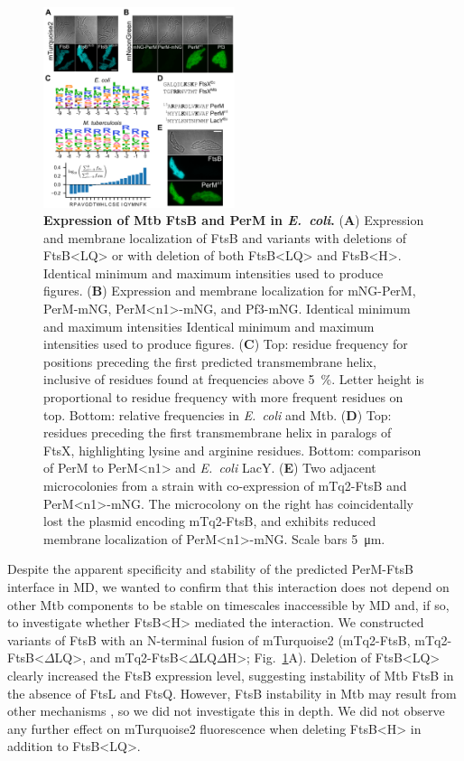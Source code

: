 \documentclass[twocolumn,pdflatex,sn-nature]{sn-jnl}%
\def\textsuperscript#1{<#1>}%
\newcommand\ec{\textit{E.~coli}}
\newcommand\mtb{Mtb}
\newcommand\ftsbLQ{FtsB\textsuperscript{LQ}}
\newcommand\ftsbH{FtsB\textsuperscript{H}}
\newcommand\ftsbdLQ{FtsB\textsuperscript{$\Delta{}$LQ}}
\newcommand\ftsbdLQdH{FtsB\textsuperscript{$\Delta{}$LQ$\Delta{}$H}}
\newcommand\permN{PerM\textsuperscript{n1}}
\begin{document}
\begin{figure}[t]
    \centering
    \includegraphics[width=0.5\textwidth]{../figures/fig2.png}
    \caption{
        \textbf{Expression of \mtb{} FtsB and PerM in \ec{}.}
        (\textbf{A}) Expression and membrane localization of FtsB and variants with deletions of \ftsbLQ{} or with deletion of both \ftsbLQ{} and \ftsbH{}. Identical minimum and maximum intensities used to produce figures.
        (\textbf{B}) Expression and membrane localization for mNG-PerM, PerM-mNG, \permN{}-mNG, and Pf3-mNG. Identical minimum and maximum intensities Identical minimum and maximum intensities used to produce figures.
        (\textbf{C}) Top: residue frequency for positions preceding the first predicted transmembrane helix, inclusive of residues found at frequencies above \qty{5}{\percent}. Letter height is proportional to residue frequency with more frequent residues on top. Bottom: relative frequencies in \ec{} and \mtb{}.
        (\textbf{D}) Top: residues preceding the first transmembrane helix in paralogs of FtsX, highlighting lysine and arginine residues. Bottom: comparison of PerM to \permN{} and \ec{} LacY.
        (\textbf{E}) Two adjacent microcolonies from a strain with co-expression of mTq2-FtsB and \permN{}-mNG. The microcolony on the right has coincidentally lost the plasmid encoding mTq2-FtsB, and exhibits reduced membrane localization of \permN{}-mNG. Scale bars \qty{5}{\um}.
    }\label{fig2}
\end{figure}

Despite the apparent specificity and stability of the predicted PerM-FtsB interface in MD, we wanted to confirm that this interaction does not depend on other \mtb{} components to be stable on timescales inaccessible by MD and, if so, to investigate whether \ftsbH{} mediated the interaction.
We constructed variants of FtsB with an N-terminal fusion of mTurquoise2 (mTq2-FtsB, mTq2-\ftsbdLQ{}, and mTq2-\ftsbdLQdH{}; Fig.~\ref{fig2}A). Deletion of \ftsbLQ{} clearly increased the FtsB expression level, suggesting instability of \mtb{} FtsB in the absence of FtsL and FtsQ.
However, FtsB instability in \mtb{} may result from other mechanisms \citep{wangPersistentMycobacteriumTuberculosis2019}, so we did not investigate this in depth.
We did not observe any further effect on mTurquoise2 fluorescence when deleting \ftsbH{} in addition to \ftsbLQ{}.
\end{document}
